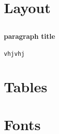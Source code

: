 \documentclass{article}
\begin{document}
	\subsection{}
	\newpage

	\section{Layout}
	\subsection{}
		\paragraph{paragraph title}
		\texttt{vhjvhj}
	\subsection{}
	\subsection{}
	\newpage
	
	\section{Tables}
	\subsection{}
	\subsection{}
	\subsection{}
	\newpage
	
	\section{Fonts}
	\subsection{}
	\subsection{}
	\subsection{}
	\newpage
	
\end{document}
